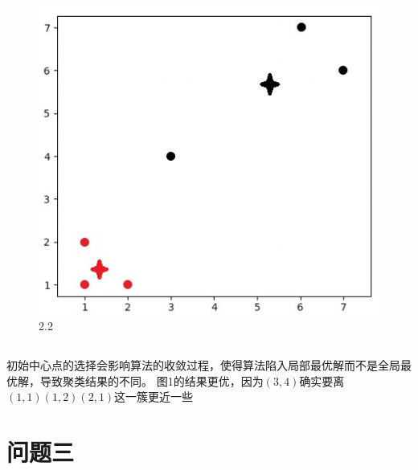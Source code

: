 \documentclass[12pt, a4paper]{article}
\begin{document}
\begin{figure}
    \centering
    \includegraphics*[scale=0.8]{img/a5_3.jpg}
    \caption{2.2}
\end{figure}

\subsection{}

初始中心点的选择会影响算法的收敛过程，使得算法陷入局部最优解而不是全局最优解，导致聚类结果的不同。
图1的结果更优，因为$(3,4)$确实要离$(1,1)(1,2)(2,1)$这一簇更近一些


\section{问题三}
\end{document}
